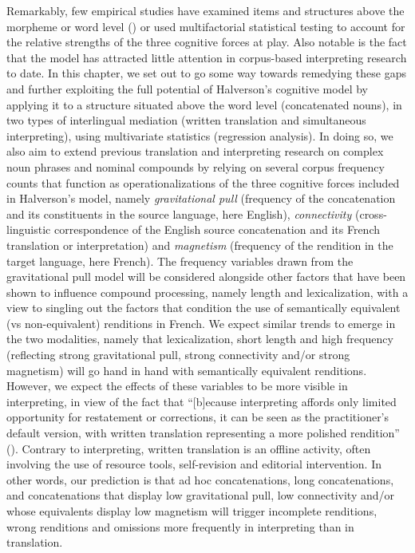 \documentclass[output=paper]{langscibook}
\begin{document}
Remarkably, few empirical studies have examined items and structures above the morpheme or word level (\citealt[cf.][40]{Halverson2017}) or used multifactorial statistical testing to account for the relative strengths of the three cognitive forces at play. Also notable is the fact that the model has attracted little attention in corpus-based interpreting research to date. In this chapter, we set out to go some way towards remedying these gaps and further exploiting the full potential of Halverson’s cognitive model by applying it to a structure situated above the word level (concatenated nouns), in two types of interlingual mediation (written translation and simultaneous interpreting), using multivariate statistics (regression analysis). In doing so, we also aim to extend previous translation and interpreting research on complex noun phrases and nominal compounds by relying on several corpus frequency counts that function as operationalizations of the three cognitive forces included in Halverson’s model, namely \textit{gravitational pull} (frequency of the concatenation and its constituents in the source language, here English), \textit{connectivity} (cross-linguistic correspondence of the English source concatenation and its French translation or interpretation) and \textit{magnetism} (frequency of the rendition in the target language, here French). The frequency variables drawn from the gravitational pull model will be considered alongside other factors that have been shown to influence compound processing, namely length and lexicalization, with a view to singling out the factors that condition the use of semantically equivalent (vs non-equivalent) renditions in French. We expect similar trends to emerge in the two modalities, namely that lexicalization, short length and high frequency (reflecting strong gravitational pull, strong connectivity and/or strong magnetism) will go hand in hand with semantically equivalent renditions. However, we expect the effects of these variables to be more visible in interpreting, in view of the fact that “[b]ecause interpreting affords only limited opportunity for restatement or corrections, it can be seen as the practitioner’s default version, with written translation representing a more polished rendition” (\citealt[185]{ShlesingerMalkiel2005}). Contrary to interpreting, written translation is an offline activity, often involving the use of resource tools, self-revision and editorial intervention. In other words, our prediction is that ad hoc concatenations, long concatenations, and concatenations that display low gravitational pull, low connectivity and/or whose equivalents display low magnetism will trigger incomplete renditions, wrong renditions and omissions more frequently in interpreting than in translation. 
\end{document}
